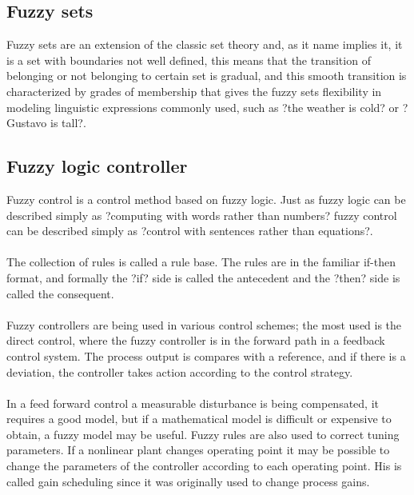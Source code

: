 \documentclass[12pt,letterpaper,oneside] {memoir}
\begin{document}
\paragraph{}
\subsection{Fuzzy sets}
Fuzzy sets are an extension of the classic set theory and, as it name implies it, it is a set with boundaries not well defined, this means that the transition of belonging or not belonging to certain set is gradual, and this smooth transition is characterized by grades of membership that gives the fuzzy sets flexibility in modeling linguistic expressions commonly used, such as ?the weather is cold? or ?Gustavo is tall?.
\paragraph{}
\subsection{Fuzzy logic controller}
Fuzzy control is a control method based on fuzzy logic. Just as fuzzy logic can be described simply as ?computing with words rather than numbers? fuzzy control can be described simply as ?control with sentences rather than equations?.
\paragraph{}
The collection of rules is called a rule base. The rules are in the familiar if-then format, and formally the ?if? side is called the antecedent and the ?then? side is called the consequent.
\paragraph{}
Fuzzy controllers are being used in various control schemes; the most used is the direct control, where the fuzzy controller is in the forward path in a feedback control system. The process output is compares with a reference, and if there is a deviation, the controller takes action according to the control strategy.
\paragraph{}
In a feed forward control a measurable disturbance is being compensated, it requires a good model, but if a mathematical model is difficult or expensive to obtain, a fuzzy model may be useful. Fuzzy rules are also used to correct tuning parameters. If a nonlinear plant changes operating point it may be possible to change the parameters of the controller according to each operating point. His is called gain scheduling since it was originally used to change process gains. 
\end{document}
